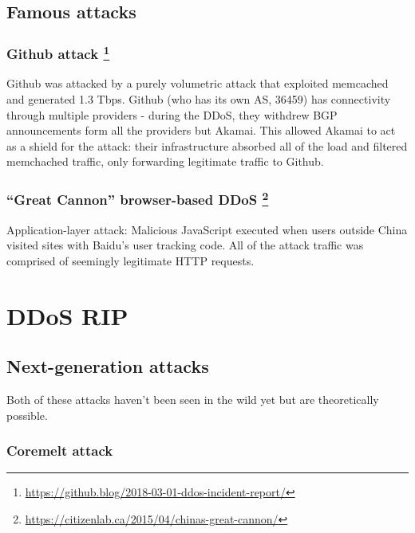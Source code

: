 \documentclass[11pt,oneside,a4paper]{article}
\begin{document}
\subsection{Famous attacks}

\subsubsection[Github attack]{Github attack \footnote{\href{https://github.blog/2018-03-01-ddos-incident-report/}{https://github.blog/2018-03-01-ddos-incident-report/}}}

Github was attacked by a purely volumetric attack that exploited memcached and generated 1.3 Tbps. Github (who has its own AS, 36459) has connectivity through multiple providers - during the DDoS, they withdrew BGP announcements form all the providers but Akamai. This allowed Akamai to act as a shield for the attack: their infrastructure absorbed all of the load and filtered memchached traffic, only forwarding legitimate traffic to Github.

\subsubsection[“Great Cannon” browser-based DDoS]{“Great Cannon” browser-based DDoS \footnote{\href{https://citizenlab.ca/2015/04/chinas-great-cannon/}{https://citizenlab.ca/2015/04/chinas-great-cannon/}}}

Application-layer attack: Malicious JavaScript executed when users outside China visited sites
with Baidu’s user tracking code. All of the attack traffic was comprised of seemingly legitimate HTTP requests.

\newpage

\section{DDoS RIP}

\subsection{Next-generation attacks}

Both of these attacks haven't been seen in the wild yet but are theoretically possible.

\subsubsection{Coremelt attack}
\end{document}
